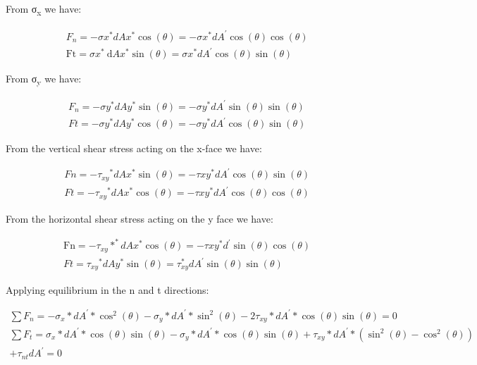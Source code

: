 \documentclass[
  letterpaper,
  DIV=11,
  numbers=noendperiod]{scrreprt}
\theoremstyle{definition}
\theoremstyle{remark}
\begin{document}
From σ\textsubscript{x} we have:

\[
\begin{aligned}
& F_n=-\sigma x^* d A x^* \cos (\theta)=-\sigma x^* d A^{\prime} \cos (\theta) \cos (\theta) \\
& \mathrm{Ft}=\sigma x^* \mathrm{~d} A x^* \sin (\theta)=\sigma x^* d A^{\prime} \cos (\theta) \sin (\theta)
\end{aligned}
\]

From σ\textsubscript{y} we have:

\[
\begin{aligned}
& F_n=-\sigma y^* d A y^* \sin (\theta)=-\sigma y^* d A^{\prime} \sin (\theta) \sin (\theta) \\
& F t=-\sigma y^* d A y^* \cos (\theta)=-\sigma y^* d A^{\prime} \cos (\theta) \sin (\theta)
\end{aligned}
\]

From the vertical shear stress acting on the x-face we have:

\[
\begin{aligned}
& F n=-\tau_{xy}{ }^* d A x^* \sin (\theta)=-\tau x y^* d A^{\prime} \cos (\theta) \sin (\theta) \\
& F t=-\tau_{xy}{ }^* d A x^* \cos (\theta)=-\tau x y^* d A^{\prime} \cos (\theta) \cos (\theta)
\end{aligned}
\]

From the horizontal shear stress acting on the y face we have:

\[
\begin{aligned}
& \mathrm{Fn}=-\tau_{xy} *^* d A x^* \cos (\theta)=-\tau x y^* d^{\prime} \sin (\theta) \cos (\theta) \\
& F t=\tau_{xy}{ }^* d A y^* \sin (\theta)=\tau_{x y}^* d A^{\prime} \sin (\theta) \sin (\theta)
\end{aligned}
\]

Applying equilibrium in the n and t directions:

\[
\begin{gathered}
\sum F_n=-\sigma_x * d A^{\prime} * \cos ^2(\theta)-\sigma_y * d A^{\prime} * \sin ^2(\theta)-2 \tau_{x y} * d A^{\prime} * \cos (\theta) \sin (\theta)=0 \\
\sum F_t=\sigma_x * d A^{\prime} * \cos (\theta) \sin (\theta)-\sigma_y * d A^{\prime} * \cos (\theta) \sin (\theta)+\tau_{x y} * d A^{\prime} *\left(\sin ^2(\theta)-\cos ^2(\theta)\right) \\
+\tau_{n t} d A^{\prime}=0
\end{gathered}
\]
\end{document}
